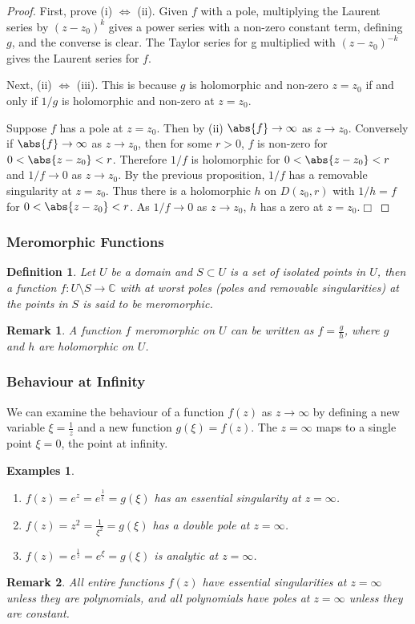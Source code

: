 \documentclass{article}
\theoremstyle{plain}\theoremheaderfont{\normalfont\itshape}\theorembodyfont{\rmfamily}\theoremseparator{.}\newtheorem*{rem}{Remark}\newtheorem*{ex}{Example}\newtheorem*{proof}{Proof}\newtheorem*{altp}{Alternative proof}
\theoremstyle{plain}\theoremheaderfont{\normalfont\bfseries}\theorembodyfont{\rmfamily}\theoremseparator{.}\newtheorem{thm}{Theorem}[section]\newtheorem{lem}[thm]{Lemma}\newtheorem{prop}[thm]{Proposition}\newtheorem*{cor}{Corollary}\newtheorem{defn}[thm]{Definition}\newtheorem{clm}[thm]{Claim}\newtheorem{clminproof}{Claim}
\theoremstyle{break}\theoremheaderfont{\normalfont\itshape}\theorembodyfont{\rmfamily}\theoremseparator{.\medskip}\newtheorem*{proofskip}{Proof}\newtheorem*{exs}{Examples}\newtheorem*{rems}{Remarks}
\theoremstyle{break}\theoremheaderfont{\normalfont\bfseries}\theorembodyfont{\rmfamily}\theoremseparator{.\medskip}\newtheorem{lemskip}[thm]{Lemma}\newtheorem{defnskip}[thm]{Definition}\newtheorem{propskip}[thm]{Proposition}\newtheorem{thmskip}[thm]{Theorem}
\numberwithin{equation}{section}
\newcommand{\qed}{\hfill\ensuremath{\Box}}
\begin{document}
	\begin{proof}
		First, prove (i) \(\Leftrightarrow\) (ii). Given \(f\) with a pole, multiplying the Laurent series by \((z-z_0)^k\) gives a power series with a non-zero constant term, defining \(g\), and the converse is clear. The Taylor series for g multiplied with \((z-z_0)^{-k}\) gives the Laurent series for \(f\).
 		
		Next, (ii) \(\Leftrightarrow\) (iii). This is because \(g\) is holomorphic and non-zero \(z=z_0\) if and only if \(1/g\) is holomorphic and non-zero at \(z=z_0\).
		
		Suppose \(f\) has a pole at \(z=z_0\). Then by (ii) \(\abs{f}\to\infty\) as \(z\to z_0\). Conversely if \(\abs{f}\to\infty\) as \(z\to z_0\), then for some \(r>0\), \(f\) is non-zero for \(0 <\abs{z-z_0}<r\). Therefore \(1/f\) is holomorphic for \(0<\abs{z-z_0}<r\) and \(1/f\to 0\) as \(z\to z_0\). By the previous proposition, \(1/f\) has a removable singularity at \(z=z_0\). Thus there is a holomorphic \(h\) on \(D(z_0,r)\) with \(1/h = f\) for \(0<\abs{z-z_0}<r\). As \(1/f\to 0\) as \(z\to z_0\), \(h\) has a zero at \(z=z_0\).\qed
	\end{proof}
	\subsubsection{Meromorphic Functions}
	\begin{defn}
		Let \(U\) be a domain and \(S\subset U\) is a set of isolated points in \(U\), then a function \(f:U\setminus S\to\mathbb{C}\) with at worst poles (poles and removable singularities) at the points in \(S\) is said to be \textit{meromorphic}.
	\end{defn}
	\begin{rem}
		A function \(f\) meromorphic on \(U\) can be written as \(f=\frac{g}{h}\),
		where \(g\) and \(h\) are holomorphic on \(U\).
	\end{rem}

	\subsubsection{Behaviour at Infinity}
	We can examine the behaviour of a function \(f(z)\) as \(z\to\infty\) by defining a new variable \(\xi=\frac{1}{z}\) and a new function \(g(\xi)=f(z)\). The \(z=\infty\) maps to a single point \(\xi=0\), the point at infinity.
	\begin{exs}
		\begin{enumerate}[topsep=0pt]
			\item \(f(z)=e^z=e^{\frac{1}{\xi}}=g(\xi)\) has an essential singularity at \(z=\infty\).
			\item \(f(z)=z^2=\frac{1}{\xi^2}=g(\xi)\) has a double pole at \(z=\infty\).
			\item \(f(z)=e^{\frac{1}{z}}=e^\xi=g(\xi)\) is analytic at \(z=\infty\).
		\end{enumerate}
	\end{exs}
	\begin{rem}
		All entire functions \(f(z)\) have essential singularities at \(z=\infty\) unless they are polynomials, and all polynomials have poles at \(z=\infty\) unless they are constant.
	\end{rem}
\end{document}
